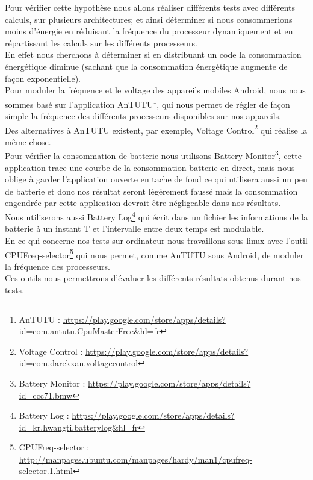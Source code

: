 	Pour vérifier cette hypothèse nous allons réaliser différents tests avec différents calculs, sur plusieurs architectures; et ainsi déterminer si nous consommerions moins d'énergie en réduisant la fréquence du processeur dynamiquement et en répartissant les calculs sur les différents processeurs.\\

	En effet nous cherchons à déterminer si en distribuant un code la consommation énergétique diminue (sachant que la consommation énergétique augmente de façon exponentielle).\\

	Pour moduler la fréquence et le voltage des appareils mobiles Android, nous nous sommes basé sur l'application AnTUTU\footnote{AnTUTU : \url{https://play.google.com/store/apps/details?id=com.antutu.CpuMasterFree&hl=fr}}, qui nous permet de régler de façon simple la fréquence des différents processeurs disponibles sur nos appareils.\\

	Des alternatives à AnTUTU existent, par exemple, Voltage Control\footnote{Voltage Control : \url{https://play.google.com/store/apps/details?id=com.darekxan.voltagecontrol}} qui réalise la même chose. \\

	Pour vérifier la consommation de batterie nous utilisons Battery Monitor\footnote{Battery Monitor : \url{https://play.google.com/store/apps/details?id=ccc71.bmw}}, cette application trace une courbe de la consommation batterie en direct, mais nous oblige à garder l'application ouverte en tache de fond ce qui utilisera aussi un peu de batterie et donc nos résultat seront légérement faussé mais la consommation engendrée par cette application devrait être négligeable dans nos résultats. \\

	Nous utiliserons aussi Battery Log\footnote{Battery Log : \url{https://play.google.com/store/apps/details?id=kr.hwangti.batterylog&hl=fr}} qui écrit dans un fichier les informations de la batterie à un instant T et l'intervalle entre deux temps est modulable.\\

	En ce qui concerne nos tests sur ordinateur nous travaillons sous linux avec l'outil CPUFreq-selector\footnote{CPUFreq-selector : \url{http://manpages.ubuntu.com/manpages/hardy/man1/cpufreq-selector.1.html}} qui nous permet, comme AnTUTU sous Android, de moduler la fréquence des processeurs.\\

	Ces outils nous permettrons d'évaluer les différents résultats obtenus durant nos tests.
